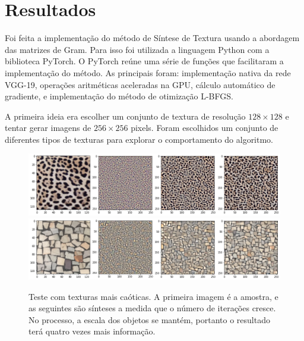 \chapter{Resultados}


Foi feita a implementação do
método de Síntese de Textura
usando a abordagem das matrizes
de Gram. 
Para isso foi utilizada 
a linguagem Python com a
biblioteca PyTorch.
O PyTorch reúne uma série de
funções que facilitaram
a implementação do método.
As principais foram: implementação
nativa da rede VGG-19, operações
aritméticas aceleradas na GPU,
cálculo automático de gradiente,
e implementação do método de
otimização L-BFGS.


A primeira ideia era escolher um
conjunto de textura de resolução
$128 \times 128$ e tentar gerar
imagens de $256 \times 256$ pixels.
Foram escolhidos um conjunto de
diferentes tipos de texturas 
para explorar o comportamento
do algoritmo.



\begin{figure}[!ht]
	\centering
	\includegraphics[width=\linewidth]{files/assets/results/result2.png}
	\includegraphics[width=\linewidth]{files/assets/results/result5.png}
	\caption{Teste com texturas mais caóticas. A primeira imagem
	é a amostra, e as seguintes são sínteses a medida que
	o número de iterações cresce.
	No processo, a escala dos objetos se mantém, portanto o resultado
	terá quatro vezes mais informação.}
	\label{img:preview}
\end{figure}


